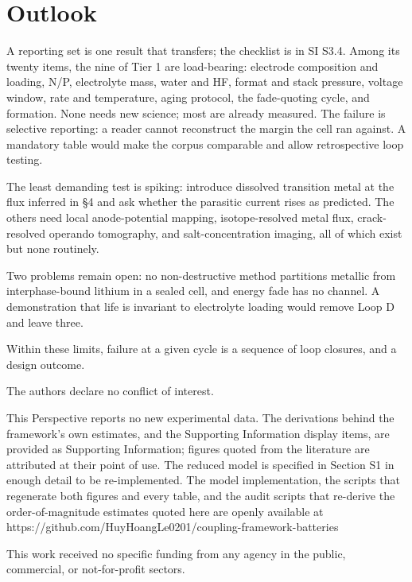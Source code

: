 \documentclass[AMA,Times2COL]{WileyNJDv5}
\begin{document}
\section{Outlook}\label{sec:Outlook}
A reporting set is one result that transfers; the checklist is in SI S3.4. Among its twenty items, the nine of Tier 1 are load-bearing: electrode composition and loading, N/P, electrolyte mass, water and HF, format and stack pressure, voltage window, rate and temperature, aging protocol, the fade-quoting cycle, and formation.\cite{dechent2021estimation} None needs new science; most are already measured. The failure is selective reporting: a reader cannot reconstruct the margin the cell ran against. A mandatory table would make the corpus comparable and allow retrospective loop testing.

The least demanding test is spiking: introduce dissolved transition metal at the flux inferred in \S4 and ask whether the parasitic current rises as predicted. The others need local anode-potential mapping, isotope-resolved metal flux, crack-resolved operando tomography, and salt-concentration imaging, all of which exist but none routinely.

Two problems remain open: no non-destructive method partitions metallic from interphase-bound lithium in a sealed cell, and energy fade has no channel. A demonstration that life is invariant to electrolyte loading would remove Loop D and leave three.

Within these limits, failure at a given cycle is a sequence of loop closures, and a design outcome.

The authors declare no conflict of interest.

This Perspective reports no new experimental data. The derivations behind the framework's own estimates, and the Supporting Information display items, are provided as Supporting Information; figures quoted from the literature are attributed at their point of use. The reduced model is specified in Section S1 in enough detail to be re-implemented. The model implementation, the scripts that regenerate both figures and every table, and the audit scripts that re-derive the order-of-magnitude estimates quoted here are openly available at https://github.com/HuyHoangLe0201/coupling-framework-batteries

This work received no specific funding from any agency in the public, commercial, or not-for-profit sectors.


\end{document}
